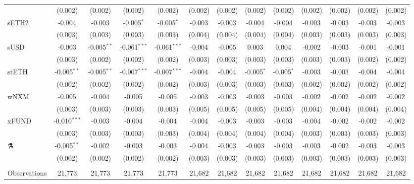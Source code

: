 \begin{table}[!htbp]
\begin{tabular}{@{\extracolsep{5pt}}lcccccccccccc}
  & (0.002) & (0.002) & (0.002) & (0.002) & (0.002) & (0.002) & (0.002) & (0.002) & (0.002) & (0.002) & (0.002) & (0.002) \\
 sETH2 & -0.004$^{}$ & -0.003$^{}$ & -0.005$^{*}$ & -0.005$^{*}$ & -0.003$^{}$ & -0.003$^{}$ & -0.004$^{}$ & -0.004$^{}$ & -0.003$^{}$ & -0.003$^{}$ & -0.003$^{}$ & -0.003$^{}$ \\
  & (0.003) & (0.003) & (0.003) & (0.003) & (0.004) & (0.004) & (0.004) & (0.004) & (0.003) & (0.003) & (0.003) & (0.003) \\
 sUSD & -0.003$^{}$ & -0.005$^{**}$ & -0.061$^{***}$ & -0.061$^{***}$ & -0.004$^{}$ & -0.005$^{}$ & 0.003$^{}$ & 0.004$^{}$ & -0.002$^{}$ & -0.003$^{}$ & -0.001$^{}$ & -0.001$^{}$ \\
  & (0.003) & (0.002) & (0.002) & (0.002) & (0.003) & (0.003) & (0.003) & (0.003) & (0.003) & (0.003) & (0.002) & (0.002) \\
 stETH & -0.005$^{**}$ & -0.005$^{**}$ & -0.007$^{***}$ & -0.007$^{***}$ & -0.004$^{}$ & -0.004$^{}$ & -0.005$^{*}$ & -0.005$^{*}$ & -0.003$^{}$ & -0.003$^{}$ & -0.004$^{}$ & -0.004$^{}$ \\
  & (0.002) & (0.002) & (0.002) & (0.002) & (0.003) & (0.003) & (0.003) & (0.003) & (0.002) & (0.002) & (0.002) & (0.002) \\
 wNXM & -0.005$^{}$ & -0.004$^{}$ & -0.005$^{}$ & -0.005$^{}$ & -0.003$^{}$ & -0.003$^{}$ & -0.003$^{}$ & -0.003$^{}$ & -0.002$^{}$ & -0.002$^{}$ & -0.002$^{}$ & -0.002$^{}$ \\
  & (0.003) & (0.003) & (0.003) & (0.003) & (0.005) & (0.005) & (0.005) & (0.005) & (0.004) & (0.004) & (0.004) & (0.004) \\
 xFUND & -0.010$^{***}$ & -0.003$^{}$ & -0.004$^{}$ & -0.004$^{}$ & -0.004$^{}$ & -0.003$^{}$ & -0.003$^{}$ & -0.003$^{}$ & -0.004$^{}$ & -0.002$^{}$ & -0.002$^{}$ & -0.002$^{}$ \\
  & (0.003) & (0.003) & (0.003) & (0.003) & (0.004) & (0.004) & (0.004) & (0.004) & (0.003) & (0.003) & (0.003) & (0.003) \\
 ⚗️ & -0.005$^{**}$ & -0.002$^{}$ & -0.003$^{}$ & -0.003$^{}$ & -0.004$^{}$ & -0.003$^{}$ & -0.003$^{}$ & -0.003$^{}$ & -0.003$^{}$ & -0.002$^{}$ & -0.003$^{}$ & -0.003$^{}$ \\
  & (0.002) & (0.002) & (0.002) & (0.002) & (0.003) & (0.003) & (0.003) & (0.003) & (0.003) & (0.003) & (0.003) & (0.003) \\
\hline \\[-1.8ex]
 Observations & 21,773 & 21,773 & 21,773 & 21,773 & 21,682 & 21,682 & 21,682 & 21,682 & 21,682 & 21,682 & 21,682 & 21,682 \\

\end{tabular}
\end{table}
